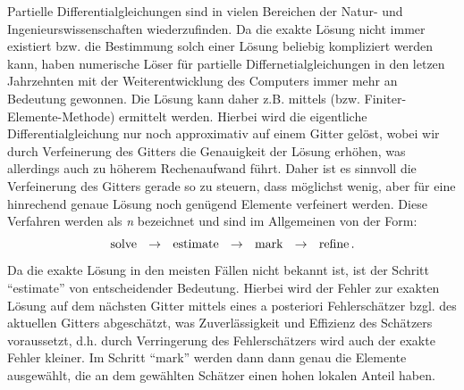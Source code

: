 \label{kap:1}


Partielle Differentialgleichungen sind in vielen Bereichen der Natur- und Ingenieurswissenschaften wiederzufinden. Da die exakte Lösung nicht immer existiert bzw. die Bestimmung solch einer Lösung beliebig kompliziert werden kann, haben numerische Löser für partielle Differnetialgleichungen in den letzen Jahrzehnten mit der Weiterentwicklung des Computers immer mehr an Bedeutung gewonnen. Die Lösung kann daher z.B. mittels  (bzw. Finiter-Elemente-Methode) ermittelt werden. Hierbei wird die eigentliche Differentialgleichung nur noch approximativ auf einem Gitter gelöst, wobei wir durch Verfeinerung des Gitters die Genauigkeit der Lösung erhöhen, was allerdings auch zu höherem Rechenaufwand führt. Daher ist es sinnvoll die Verfeinerung des Gitters gerade so zu steuern, dass möglichst wenig, aber für eine hinrechend genaue Lösung noch genügend Elemente verfeinert werden. Diese Verfahren werden als \textit{n} bezeichnet und sind im Allgemeinen von der Form:
\[
	\text{solve}\ \ \ra \ \ \text{estimate}\ \ \ra\ \ \text{mark}\ \ \ra\  \ \text{refine} \, .
\]
Da die exakte Lösung in den meisten Fällen nicht bekannt ist, ist der Schritt "`estimate"' von entscheidender Bedeutung. Hierbei wird der Fehler zur exakten Lösung auf dem nächsten Gitter mittels eines a posteriori Fehlerschätzer bzgl. des aktuellen Gitters abgeschätzt, was Zuverlässigkeit und Effizienz des Schätzers voraussetzt, d.h. durch Verringerung des Fehlerschätzers wird auch der exakte Fehler kleiner. Im Schritt "`mark"' werden dann dann genau die Elemente ausgewählt, die an dem gewählten Schätzer einen hohen lokalen Anteil haben.

